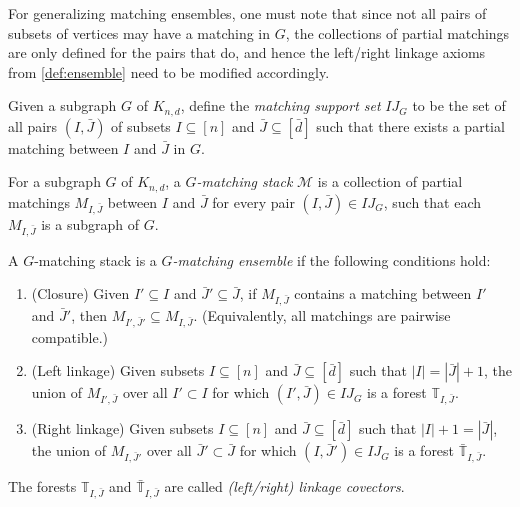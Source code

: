 \documentclass[letterpaper,reqno,11pt]{amsart}
\begin{document}
For generalizing matching ensembles, one must note that since not all pairs of subsets of vertices may have a matching in $G$, the collections of partial matchings are only defined for the pairs that do, and hence the left/right linkage axioms from \cref{def:ensemble} need to be modified accordingly.

\begin{definition}
    Given a subgraph $G$ of $K_{n,d}$, define the \emph{matching support set} $IJ_G$ to be the set of all pairs $(I, \bar{J})$ of subsets $I\subseteq [n]$ and $\bar{J}\subseteq [\bar{d}]$ such that there exists a partial matching between $I$ and $\bar{J}$ in $G$.
\end{definition}

\begin{definition}
    For a subgraph $G$ of $K_{n,d}$, a \emph{$G$-matching stack} $\mathcal{M}$ is a collection of partial matchings $M_{I, \bar{J}}$ between $I$ and $\bar{J}$ for every pair $(I, \bar{J})\in IJ_G$, such that each $M_{I, \bar{J}}$ is a subgraph of $G$.

    A $G$-matching stack is a \emph{$G$-matching ensemble} if the following conditions hold: \begin{enumerate}
        \item (Closure) Given $I'\subseteq I$ and $\bar{J}'\subseteq \bar{J}$, if $M_{I, \bar{J}}$ contains a matching between $I'$ and $\bar{J}'$, then $M_{I', \bar{J}'} \subseteq M_{I, \bar{J}}$. (Equivalently, all matchings are pairwise compatible.)
        \item (Left linkage) Given subsets $I\subseteq [n]$ and $\bar{J}\subseteq [\bar{d}]$ such that $|I| = |\bar{J}| + 1$, the union of $M_{I', \bar{J}}$ over all $I'\subset I$ for which $(I', \bar{J})\in IJ_G$ is a forest $\mathbb{T}_{I, \bar{J}}$.
        \item (Right linkage) Given subsets $I\subseteq [n]$ and $\bar{J}\subseteq [\bar{d}]$ such that $|I| + 1 = |\bar{J}|$, the union of $M_{I, \bar{J}'}$ over all $\bar{J}'\subset \bar{J}$ for which $(I, \bar{J}')\in IJ_G$ is a forest $\bar{\mathbb{T}}_{I, \bar{J}}$.
    \end{enumerate}

    The forests $\mathbb{T}_{I, \bar{J}}$ and $\bar{\mathbb{T}}_{I, \bar{J}}$ are called \emph{(left/right) linkage covectors}.
\end{definition}
\end{document}
